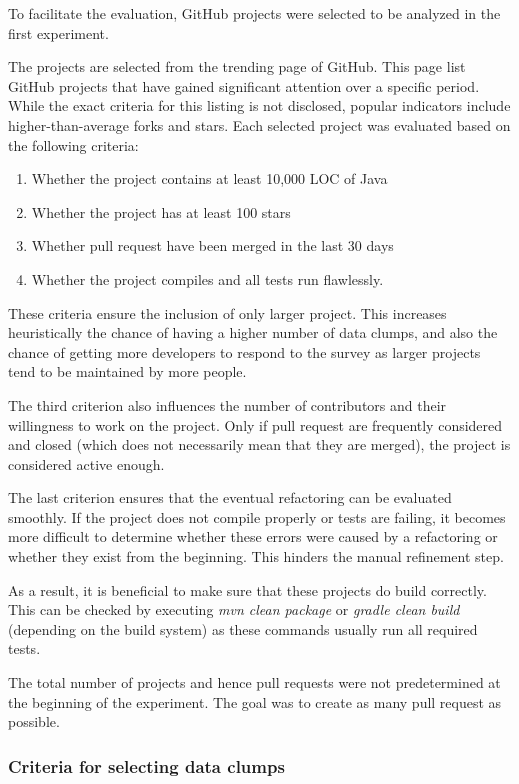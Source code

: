 To facilitate the evaluation, GitHub projects were selected to be analyzed in the first experiment. 


The projects are selected from the trending page of GitHub. This page list GitHub projects that have gained significant attention over a specific  period. While the exact criteria for this listing is not disclosed, popular indicators include higher-than-average forks and stars. Each selected project was evaluated based on the following criteria:
\begin{enumerate}
    \item Whether the project contains at least  10,000 \ac{LOC} of Java
        \item Whether the project  has at least 100 stars
\item Whether pull request have been merged in the last 30 days
\item Whether the project compiles and all tests run flawlessly.
\end{enumerate}

These criteria ensure the inclusion of  only larger project. This increases heuristically the chance of having a higher number of data clumps, and also the chance of getting more developers to respond to the survey as larger projects tend to be maintained by more people. 

The third criterion also influences the number of contributors and their willingness to work on the project. Only if pull request are frequently considered and closed (which does not necessarily mean that they are merged), the project is considered active enough. 

The last criterion ensures that the eventual refactoring can be evaluated smoothly. If the project does not compile properly or tests are failing, it becomes more difficult to determine whether these errors were caused by a refactoring or whether they exist from the beginning. This hinders the manual refinement step.

As a result, it is beneficial to make sure that these projects do build correctly. This can be checked by executing \textit{mvn clean package} or \textit{gradle clean build} (depending on the build system) as these commands usually run all required tests.


The total number of projects and hence pull requests were not predetermined at the beginning of the experiment. The goal was to create as many pull request as possible. 


\subsubsection{Criteria for selecting data clumps}

